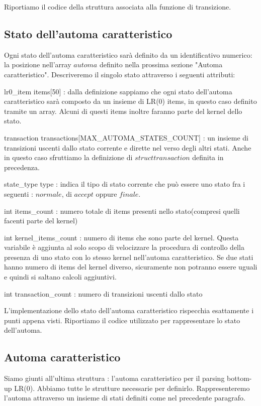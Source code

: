 \documentclass[12pt]{article}
\begin{document}
Riportiamo il codice della struttura associata alla funzione di transizione.




\subsection{Stato dell'automa caratteristico}
Ogni stato dell'automa caratteristico sarà definito da un identificativo numerico: la posizione nell'array $automa$ definito nella prossima sezione "Automa caratteristico". Descriveremo il singolo stato attraverso i seguenti attributi:
\begin{list}{-}{}
\item lr0\_item items[50] : dalla definizione sappiamo che ogni stato dell'automa caratteristico sarà composto da un insieme di LR(0) items, in questo caso definito tramite un array. Alcuni di questi items inoltre faranno parte del kernel dello stato.
\item transaction transactions[MAX\_AUTOMA\_STATES\_COUNT] : un insieme di transizioni uscenti dallo stato corrente e dirette nel verso degli altri stati. Anche in questo caso sfruttiamo la definizione di $struct transaction$ definita in precedenza.
\item state\_type type : indica il tipo di stato corrente che può essere uno stato fra i seguenti : $normale$, di $accept$ oppure $finale$.
\item int items\_count : numero totale di items presenti nello stato(compresi quelli facenti parte del kernel)
\item int kernel\_items\_count : numero di items che sono parte del kernel. Questa variabile è aggiunta al solo scopo di velocizzare la procedura di controllo della presenza di uno stato con lo stesso kernel nell'automa caratteristico. Se due stati hanno numero di items del kernel diverso, sicuramente non potranno essere uguali e quindi si saltano calcoli aggiuntivi.
\item int transaction\_count : numero di transizioni uscenti dallo stato
\end{list}

L'implementazione dello stato dell'automa caratteristico rispecchia esattamente i punti appena visti.
Riportiamo il codice utilizzato per rappresentare lo stato dell'automa.


\subsection{Automa caratteristico}
Siamo giunti all'ultima struttura : l'automa caratteristico per il parsing bottom-up LR(0). Abbiamo tutte le strutture necessarie per definirlo. Rappresenteremo l'automa attraverso un insieme di stati definiti come nel precedente paragrafo.\\
\end{document}
